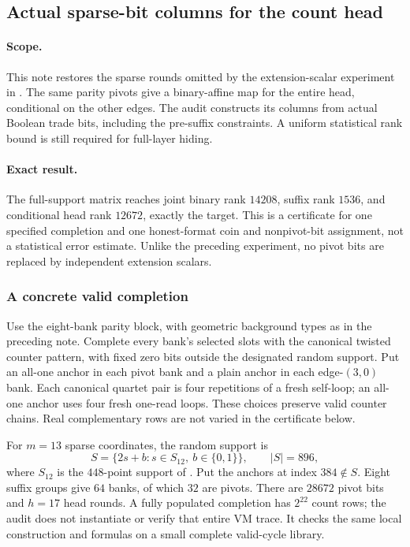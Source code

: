 \subsection{Actual sparse-bit columns for the count head}\label{note:zk-count-full-head}

\paragraph{Scope.} This note restores the sparse rounds omitted by the extension-scalar experiment in . The same parity pivots give a binary-affine map for the entire head, conditional on the other edges. The audit constructs its columns from actual Boolean trade bits, including the pre-suffix constraints. A uniform statistical rank bound is still required for full-layer hiding.

\paragraph{Exact result.} The full-support matrix reaches joint binary rank $14208$, suffix rank $1536$, and conditional head rank $12672$, exactly the target. This is a certificate for one specified completion and one honest-format coin and nonpivot-bit assignment, not a statistical error estimate. Unlike the preceding experiment, no pivot bits are replaced by independent extension scalars.

\subsubsection{A concrete valid completion}

Use the eight-bank parity block, with geometric background types as in the preceding note. Complete every bank's selected slots with the canonical twisted counter pattern, with fixed zero bits outside the designated random support. Put an all-one anchor in each pivot bank and a plain anchor in each edge-$(3,0)$ bank. Each canonical quartet pair is four repetitions of a fresh self-loop; an all-one anchor uses four fresh one-read loops. These choices preserve valid counter chains. Real complementary rows are not varied in the certificate below.

For $m=13$ sparse coordinates, the random support is
\[
 S=\{2s+b:s\in S_{12},\ b\in\{0,1\}\},\qquad |S|=896,
\]
where $S_{12}$ is the $448$-point support of . Put the anchors at index $384\notin S$. Eight suffix groups give $64$ banks, of which $32$ are pivots. There are $28672$ pivot bits and $h=17$ head rounds. A fully populated completion has $2^{22}$ count rows; the audit does not instantiate or verify that entire VM trace. It checks the same local construction and formulas on a small complete valid-cycle library.

